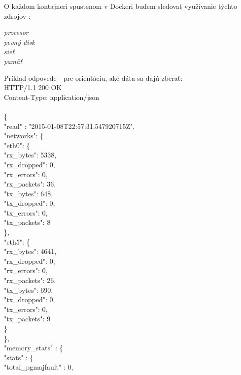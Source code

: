 \documentclass[11pt,final,oneside]{fithesis}
\begin{document}
O každom kontajneri spustenom v Dockeri budem sledovať využívanie týchto zdrojov :
\begin{description}
\item[\emph{procesor}]
\item[\emph{pevný disk}]
\item[\emph{sieť}]
\item[\emph{pamäť}]
\end{description}

Príklad odpovede - pre orientáciu, aké dáta sa dajú zberať:
\\  HTTP/1.1 200 OK
\\  Content-Type: application/json
\\
\\  \{
\\     "read" : "2015-01-08T22:57:31.547920715Z",
\\     "networks": \{
\\            "eth0": \{
\\                 "rx_bytes": 5338,
\\                 "rx_dropped": 0,
\\                 "rx_errors": 0,
\\                 "rx_packets": 36,
\\                 "tx_bytes": 648,
\\                 "tx_dropped": 0,
\\                 "tx_errors": 0,
\\                 "tx_packets": 8
\\             \},
\\             "eth5": \{
\\                 "rx_bytes": 4641,
\\                 "rx_dropped": 0,
\\                 "rx_errors": 0,
\\                 "rx_packets": 26,
\\                 "tx_bytes": 690,
\\                 "tx_dropped": 0,
\\                 "tx_errors": 0,
\\                 "tx_packets": 9
\\             \}
\\     \},
\\     "memory_stats" : \{
\\        "stats" : \{
\\           "total_pgmajfault" : 0,
\end{document}
